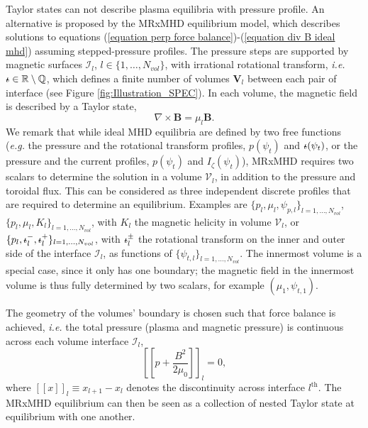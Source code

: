 \documentclass[my_thesis.tex]{subfiles}
\begin{document}
Taylor states can not describe plasma equilibria with pressure profile. An alternative is proposed by the MRxMHD equilibrium model, which describes solutions to equations (\ref{equation perp force balance})-(\ref{equation div B ideal mhd}) assuming stepped-pressure profiles. The pressure steps are supported by magnetic surfaces $\mathcal{I}_l$, $l\in\{1,\ldots,N_{vol}\}$, with irrational rotational transform, \textit{i.e.} $\text{$\iota\!\!$-}\in\mathbb{R}\setminus\mathbb{Q}$, which defines a finite number of volumes $\mathbf{V}_l$ between each pair of interface (see Figure \ref{fig:Illustration_SPEC}). In each volume, the magnetic field is described by a Taylor state, 
\begin{equation}
	\nabla\times\mathbf{B}=\mu_l\mathbf{B}. \label{eq.BeltramiEquation}
\end{equation}
We remark that while ideal \ac{MHD} equilibria are defined by two free functions (\textit{e.g.} the pressure and the rotational transform profiles, $p(\psi_t)$ and $\text{$\iota\!\!$-}(\psi_t)$, or the pressure and the current profiles, $p(\psi_t)$ and $I_\zeta(\psi_t)$), \ac{MRxMHD} requires two scalars to determine the solution in a volume $\mathcal{V}_l$, in addition to the pressure and toroidal flux. This can be considered as three independent discrete profiles that are required to determine an equilibrium. Examples are $\{p_l, \mu_l, \psi_{p,l}\}_{l=1,\ldots,N_{vol}}$, $\{p_l, \mu_l, K_l\}_{l=1,\ldots,N_{vol}}$, with $K_l$ the magnetic helicity in volume $\mathcal{V}_l$, or $\{p_l,\text{$\iota\!\!$-}^-_l,\text{$\iota\!\!$-}^+_l\}_{l=1,\ldots,N_{vol}}$, with $\text{$\iota\!\!$-}^\pm_l$ the rotational transform on the inner and outer side of the interface $\mathcal{I}_l$, as functions of $\{\psi_{t,l}\}_{l=1,\ldots,N_{vol}}$. The innermost volume is a special case, since it only has one boundary; the magnetic field in the innermost volume is thus fully determined by two scalars, for example $(\mu_1,\psi_{t,1})$.

The geometry of the volumes' boundary is chosen such that force balance is achieved, \textit{i.e.} the total pressure (plasma and magnetic pressure) is continuous across each volume interface $\mathcal{I}_l$,
\begin{equation}
	\left[\left[p + \frac{B^2}{2\mu_0}\right]\right]_l = 0, \label{eq.force_balance}
\end{equation}
where $[[x]]_l\equiv x_{l+1}-x_l$ denotes the discontinuity across interface $l^{\text{th}}$. The MRxMHD equilibrium can then be seen as a collection of nested Taylor state at equilibrium with one another. 
\end{document}
